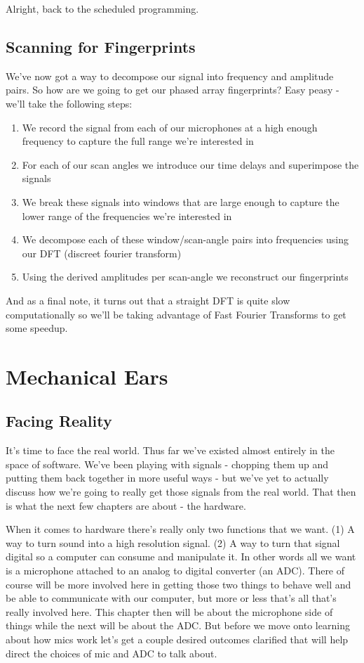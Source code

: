 \documentclass[10pt,a5paper]{book}
\begin{document}
Alright, back to the scheduled programming. 

\section{Scanning for Fingerprints}
We've now got a way to decompose our signal into frequency and amplitude pairs. So how are we going to get our phased array fingerprints? Easy peasy - we'll take the following steps:

\begin{enumerate}
\item We record the signal from each of our microphones at a high enough frequency to capture the full range we're interested in
\item For each of our scan angles we introduce our time delays and superimpose the signals
\item We break these signals into windows that are large enough to capture the lower range of the frequencies we're interested in
\item We decompose each of these window/scan-angle pairs into frequencies using our DFT (discreet fourier transform)
\item Using the derived amplitudes per scan-angle we reconstruct our fingerprints
\end{enumerate}

And as a final note, it turns out that a straight DFT is quite slow computationally so we'll be taking advantage of Fast Fourier Transforms to get some speedup.  

\newpage
\chapter{Mechanical Ears}
\section{Facing Reality}
It's time to face the real world. Thus far we've existed almost entirely in the space of software. We've been playing with signals - chopping them up and putting them back together in more useful ways - but we've yet to actually discuss how we're going to really get those signals from the real world. That then is what the next few chapters are about - the hardware. 

When it comes to hardware there's really only two functions that we want. (1) A way to turn sound into a high resolution signal. (2) A way to turn that signal digital so a computer can consume and manipulate it. In other words all we want is a microphone attached to an analog to digital converter (an ADC). There of course will be more involved here in getting those two things to behave well and be able to communicate with our computer, but more or less that's all that's really involved here. This chapter then will be about the microphone side of things while the next will be about the ADC. But before we move onto learning about how mics work let's get a couple desired outcomes clarified that will help direct the choices of mic and ADC to talk about.  
\end{document}
